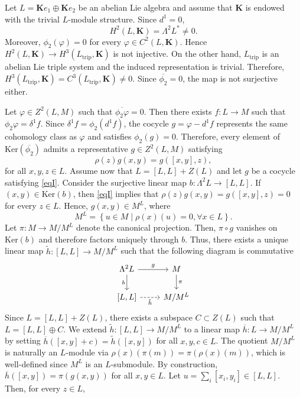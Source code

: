 \documentclass[11pt, twoside]{article}
\begin{document}
\begin{ex}
    Let $L=\mathbf{K}e_1\oplus\mathbf{K}e_2$ be an abelian Lie algebra and assume that $\mathbf{K} $ is endowed with the trivial $L$-module structure. Since $d^1=0 $, $$H^2(L,\mathbf{K})=\Lambda^2L^*\neq 0. $$ Moreover, $\phi_2(\varphi)=0$ for every $\varphi\in C^2(L,\mathbf{K})$. Hence $H^2(L,\mathbf{K})\to H^3(L_\mathrm{trip},\mathbf{K})$ is not injective. On the other hand, $L_\mathrm{trip}$ is an abelian Lie triple system and the induced representation is trivial. Therefore, $H^3(L_\mathrm{trip},\mathbf{K})=C^3(L_\mathrm{trip},\mathbf{K})\neq 0 $. Since $\overline{\phi_2}=0 $, the map is not surjective either.
\end{ex}

Let $\varphi\in Z^2(L,M)$ such that $\overline{\phi_2\varphi}=0. $ Then there exists $f:L\to M$ such that $\phi_2\varphi=\delta^1f $. Since $\delta^1f=\phi_2(d^1f)$, the cocycle $g=\varphi-d^1f $ represents the same cohomology class as $\varphi $ and satisfies $\phi_2(g)=0$. Therefore, every element of $\mathrm{Ker}(\overline{\phi_2})$ admits a representative $g\in Z^2(L,M)$ satisfying \begin{equation}\label{eqI}
    \rho(z)g(x,y)=g([x,y],z),
\end{equation} for all $x,y,z\in L$. Assume now that $L=[L,L]+Z(L) $ and let $g$ be a cocycle satisfying \eqref{eqI}. Consider the surjective linear map $b:\Lambda^2L\to [L,L] $. If $(x,y)\in \mathrm{Ker}(b)$, then \eqref{eqI} implies that $\rho(z)g(x,y)=g([x,y],z)=0 $ for every $z\in L$. Hence, $g(x,y)\in M^L $, where $$M^L=\left\{ u\in M\mid \rho(x)(u)=0, \forall x\in L\right\}.$$ Let $\pi:M\to M/M^L $ denote the canonical projection. Then, $\pi\circ g $ vanishes on $\mathrm{Ker}(b) $ and therefore factors uniquely through $b$. Thus, there exists a unique linear map $\tilde{h}:[L,L]\to M/M^L $ such that the following diagram is commutative \[\begin{tikzcd}
	{\Lambda^2L} & M \\
	{[L,L]} & {M/M^L}
	\arrow["g", from=1-1, to=1-2]
	\arrow["b"', from=1-1, to=2-1]
	\arrow["\pi", from=1-2, to=2-2]
	\arrow["{\tilde{h}}"', dashed, from=2-1, to=2-2]
\end{tikzcd}\] Since $L=[L,L]+Z(L) $, there exists a subspace $C\subset Z(L)$ such that $L=[L,L]\oplus C $. We extend $\tilde{h}:[L,L]\to M/M^L $ to a linear map $\overline{h}:L\to M/M^L $ by setting $\overline{h}([x,y]+c)=\tilde{h}([x,y]) $ for all $x,y,c\in L$. The quotient $M/M^L$ is naturally an $L$-module via $\rho(x)(\pi(m))=\pi(\rho(x)(m)) $, which is well-defined since $M^L$ is an $L$-submodule. By construction, $\overline{h}([x,y])=\pi(g(x,y)) $ for all $x,y\in L$. Let $u=\sum\limits_i[x_i,y_i] \in [L,L]$. Then, for every $z\in L$, \begin{align*}

\end{align*}
\end{document}
